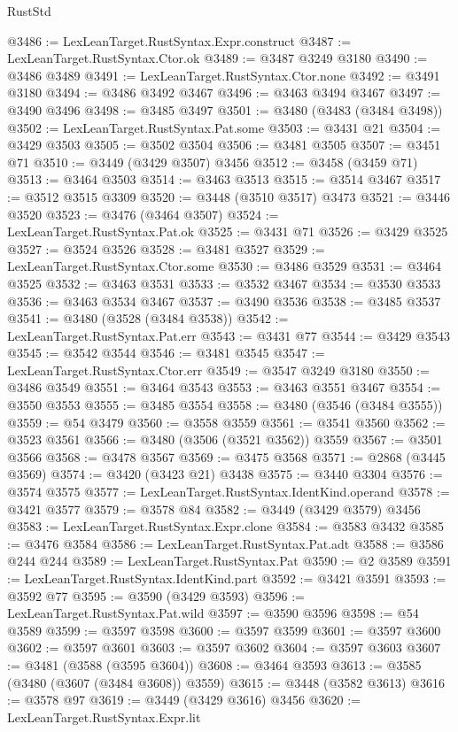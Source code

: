 \begin{lexlean}{RustStd}
\begin{coremodule}
{\begin{coremodule}
{{{{{{{{{{{{{{{{{{{{{{{{{{{{{{{{{{{{{{{{{{{{{{{{{{{{{{{{{{{{{{{{{{{{{{{{{{{{{{{{{{{{{@3486 := LexLeanTarget.RustSyntax.Expr.construct
@3487 := LexLeanTarget.RustSyntax.Ctor.ok
@3489 := @3487 @3249 @3180
@3490 := @3486 @3489
@3491 := LexLeanTarget.RustSyntax.Ctor.none
@3492 := @3491 @3180
@3494 := @3486 @3492 @3467
@3496 := @3463 @3494 @3467
@3497 := @3490 @3496
@3498 := @3485 @3497
@3501 := @3480 (@3483 (@3484 @3498))
@3502 := LexLeanTarget.RustSyntax.Pat.some
@3503 := @3431 @21
@3504 := @3429 @3503
@3505 := @3502 @3504
@3506 := @3481 @3505
@3507 := @3451 @71
@3510 := @3449 (@3429 @3507) @3456
@3512 := @3458 (@3459 @71)
@3513 := @3464 @3503
@3514 := @3463 @3513
@3515 := @3514 @3467
@3517 := @3512 @3515 @3309
@3520 := @3448 (@3510 @3517) @3473
@3521 := @3446 @3520
@3523 := @3476 (@3464 @3507)
@3524 := LexLeanTarget.RustSyntax.Pat.ok
@3525 := @3431 @71
@3526 := @3429 @3525
@3527 := @3524 @3526
@3528 := @3481 @3527
@3529 := LexLeanTarget.RustSyntax.Ctor.some
@3530 := @3486 @3529
@3531 := @3464 @3525
@3532 := @3463 @3531
@3533 := @3532 @3467
@3534 := @3530 @3533
@3536 := @3463 @3534 @3467
@3537 := @3490 @3536
@3538 := @3485 @3537
@3541 := @3480 (@3528 (@3484 @3538))
@3542 := LexLeanTarget.RustSyntax.Pat.err
@3543 := @3431 @77
@3544 := @3429 @3543
@3545 := @3542 @3544
@3546 := @3481 @3545
@3547 := LexLeanTarget.RustSyntax.Ctor.err
@3549 := @3547 @3249 @3180
@3550 := @3486 @3549
@3551 := @3464 @3543
@3553 := @3463 @3551 @3467
@3554 := @3550 @3553
@3555 := @3485 @3554
@3558 := @3480 (@3546 (@3484 @3555))
@3559 := @54 @3479
@3560 := @3558 @3559
@3561 := @3541 @3560
@3562 := @3523 @3561
@3566 := @3480 (@3506 (@3521 @3562)) @3559
@3567 := @3501 @3566
@3568 := @3478 @3567
@3569 := @3475 @3568
@3571 := @2868 (@3445 @3569)
@3574 := @3420 (@3423 @21) @3438
@3575 := @3440 @3304
@3576 := @3574 @3575
@3577 := LexLeanTarget.RustSyntax.IdentKind.operand
@3578 := @3421 @3577
@3579 := @3578 @84
@3582 := @3449 (@3429 @3579) @3456
@3583 := LexLeanTarget.RustSyntax.Expr.clone
@3584 := @3583 @3432
@3585 := @3476 @3584
@3586 := LexLeanTarget.RustSyntax.Pat.adt
@3588 := @3586 @244 @244
@3589 := LexLeanTarget.RustSyntax.Pat
@3590 := @2 @3589
@3591 := LexLeanTarget.RustSyntax.IdentKind.part
@3592 := @3421 @3591
@3593 := @3592 @77
@3595 := @3590 (@3429 @3593)
@3596 := LexLeanTarget.RustSyntax.Pat.wild
@3597 := @3590 @3596
@3598 := @54 @3589
@3599 := @3597 @3598
@3600 := @3597 @3599
@3601 := @3597 @3600
@3602 := @3597 @3601
@3603 := @3597 @3602
@3604 := @3597 @3603
@3607 := @3481 (@3588 (@3595 @3604))
@3608 := @3464 @3593
@3613 := @3585 (@3480 (@3607 (@3484 @3608)) @3559)
@3615 := @3448 (@3582 @3613)
@3616 := @3578 @97
@3619 := @3449 (@3429 @3616) @3456
@3620 := LexLeanTarget.RustSyntax.Expr.lit
}}}}}}}}}}}}}}}}}}}}}}}}}}}}}}}}}}}}}}}}}}}}}}}}}}}}}}}}}}}}}}}}}}}}}}}}}}}}}}}}}}}}}
\end{coremodule}}
\end{coremodule}
\end{lexlean}

